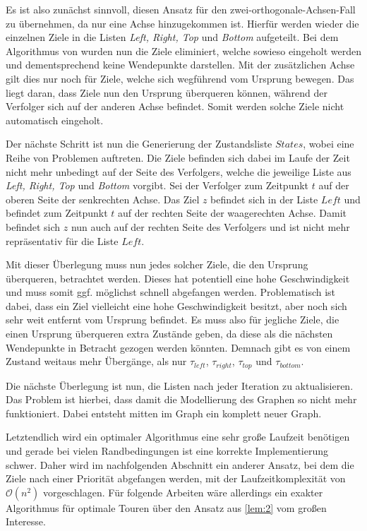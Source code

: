 \documentclass[german,version-2019-11]{uzl-thesis}
\begin{document}
Es ist also zunächst sinnvoll, diesen Ansatz für den zwei-orthogonale-Achsen-Fall zu übernehmen, da nur eine Achse hinzugekommen ist. Hierfür werden wieder die einzelnen Ziele in die Listen \emph{Left, Right, Top} und \emph{Bottom} aufgeteilt. Bei dem Algorithmus von \cite{helvig} wurden nun die Ziele eliminiert, welche sowieso eingeholt werden und dementsprechend keine Wendepunkte darstellen. Mit der zusätzlichen Achse gilt dies nur noch für Ziele, welche sich wegführend vom Ursprung bewegen. Das liegt daran, dass Ziele nun den Ursprung überqueren können, während der Verfolger sich auf der anderen Achse befindet. Somit werden solche Ziele nicht automatisch eingeholt. 

Der nächste Schritt ist nun die Generierung der Zustandsliste $States$, wobei eine Reihe von Problemen auftreten. Die Ziele befinden sich dabei im Laufe der Zeit nicht mehr unbedingt auf der Seite des Verfolgers, welche die jeweilige Liste aus \emph{Left, Right, Top} und \emph{Bottom} vorgibt. Sei der Verfolger zum Zeitpunkt $t$ auf der oberen Seite der senkrechten Achse. Das Ziel $z$ befindet sich in der Liste $Left$ und befindet zum Zeitpunkt $t$ auf der rechten Seite der waagerechten Achse. Damit befindet sich $z$ nun auch auf der rechten Seite des Verfolgers und ist nicht mehr repräsentativ für die Liste $Left$. 

Mit dieser Überlegung muss nun jedes solcher Ziele, die den Ursprung überqueren, betrachtet werden. Dieses hat potentiell eine hohe Geschwindigkeit und muss somit ggf. möglichst schnell abgefangen werden. Problematisch ist dabei, dass ein Ziel vielleicht eine hohe Geschwindigkeit besitzt, aber noch sich sehr weit entfernt vom Ursprung befindet. Es muss also für jegliche Ziele, die einen Ursprung überqueren extra Zustände geben, da diese als die nächsten Wendepunkte in Betracht gezogen werden könnten. Demnach gibt es von einem Zustand weitaus mehr Übergänge, als nur $\tau_{left}$, $\tau_{right}$, $\tau_{top}$ und $\tau_{bottom}$. 

Die nächste Überlegung ist nun, die Listen nach jeder Iteration zu aktualisieren. Das Problem ist hierbei, dass damit die Modellierung des Graphen so nicht mehr funktioniert. Dabei entsteht mitten im Graph ein komplett neuer Graph. 
 
Letztendlich wird ein optimaler Algorithmus eine sehr große Laufzeit benötigen und gerade bei vielen Randbedingungen ist eine korrekte Implementierung schwer. Daher wird im nachfolgenden Abschnitt ein anderer Ansatz, bei dem die Ziele nach einer Priorität abgefangen werden, mit der Laufzeitkomplexität von $\mathcal{O}(n^2)$ vorgeschlagen. Für folgende Arbeiten wäre allerdings ein exakter Algorithmus für optimale Touren über den Ansatz aus \ref{lem:2} vom großen Interesse.
\end{document}
